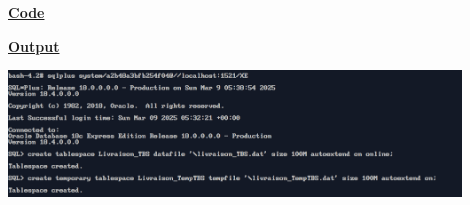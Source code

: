 \newpage
{}

\textbf{\underline{Code}}


\vspace{1cm}
\textbf{\underline{Output}}
\vspace{1cm}
\begin{center}
    \includegraphics[width=0.9\textwidth]{Questions/q42/q42.png}
\end{center}

